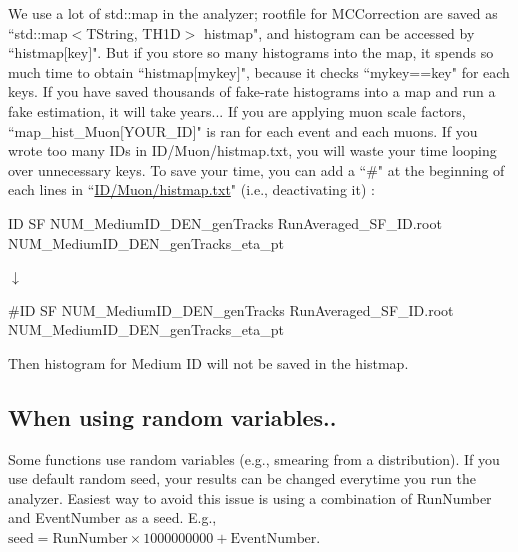 \documentclass[12pt, a4paper, titlepage]{article}
\begin{document}
We use a lot of std::map in the analyzer; rootfile for MCCorrection are saved as ``std::map$<$TString, TH1D$>$ histmap",
and histogram can be accessed by ``histmap$[$key$]$".
But if you store so many histograms into the map, it spends so much time to obtain ``histmap$[$mykey$]$",
because it checks ``mykey==key" for each keys.
If you have saved thousands of fake-rate histograms into a map and run a fake estimation, it will take years...
If you are applying muon scale factors,
``map\_hist\_Muon$[$YOUR\_ID$]$" is ran for each event and each muons.
If you wrote too many IDs in ID/Muon/histmap.txt, you will waste your time looping over unnecessary keys.
To save your time, you can add a ``\#" at the beginning of each lines in ``\href{https://github.com/CMSSNU/SKFlatAnalyzer/blob/Run2Legacy\_v1\_\_190123/data/Run2Legacy\_v1/2016/ID/Muon/histmap.txt}{ID/Muon/histmap.txt}" (i.e., deactivating it) : \\
\centerline{ID SF NUM\_MediumID\_DEN\_genTracks RunAveraged\_SF\_ID.root NUM\_MediumID\_DEN\_genTracks\_eta\_pt}
\centerline{$\downarrow$}
\centerline{\#ID SF NUM\_MediumID\_DEN\_genTracks RunAveraged\_SF\_ID.root NUM\_MediumID\_DEN\_genTracks\_eta\_pt}
Then histogram for Medium ID will not be saved in the histmap.

\subsection{When using random variables..}

Some functions use random variables (e.g., smearing from a distribution).
If you use default random seed, your results can be changed everytime you run the analyzer.
Easiest way to avoid this issue is using a combination of RunNumber and EventNumber as a seed.
E.g., $\text{seed} = \text{RunNumber} \times 1000000000 + \text{EventNumber}$.
\end{document}
